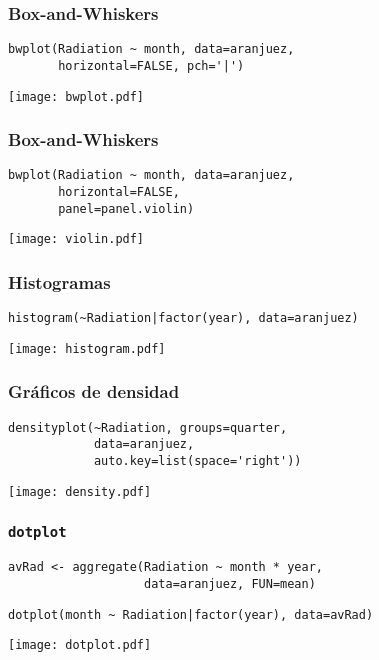 \documentclass[xcolor={usenames,svgnames,dvipsnames}]{beamer}
\begin{document}
\begin{frame}[fragile]
\frametitle{Box-and-Whiskers}
\label{sec-2-1-20}


\lstset{language=R}
\begin{lstlisting}
bwplot(Radiation ~ month, data=aranjuez,
       horizontal=FALSE, pch='|')
\end{lstlisting}

\texttt{[image: bwplot.pdf]}
\end{frame}
\begin{frame}[fragile]
\frametitle{Box-and-Whiskers}
\label{sec-2-1-21}


\lstset{language=R}
\begin{lstlisting}
bwplot(Radiation ~ month, data=aranjuez,
       horizontal=FALSE,
       panel=panel.violin)
\end{lstlisting}

\texttt{[image: violin.pdf]}

    
\end{frame}
\begin{frame}[fragile]
\frametitle{Histogramas}
\label{sec-2-1-22}


\lstset{language=R}
\begin{lstlisting}
histogram(~Radiation|factor(year), data=aranjuez)
\end{lstlisting}

\texttt{[image: histogram.pdf]}
\end{frame}
\begin{frame}[fragile]
\frametitle{Gráficos de densidad}
\label{sec-2-1-23}


\lstset{language=R}
\begin{lstlisting}
densityplot(~Radiation, groups=quarter,
            data=aranjuez,
            auto.key=list(space='right'))
\end{lstlisting}

\texttt{[image: density.pdf]}
\end{frame}
\begin{frame}[fragile]
\frametitle{\texttt{dotplot}}
\label{sec-2-1-24}


\lstset{language=R}
\begin{lstlisting}
avRad <- aggregate(Radiation ~ month * year,
                   data=aranjuez, FUN=mean)
\end{lstlisting}



\lstset{language=R}
\begin{lstlisting}
dotplot(month ~ Radiation|factor(year), data=avRad)
\end{lstlisting}

\texttt{[image: dotplot.pdf]}
\end{frame}
\end{document}
